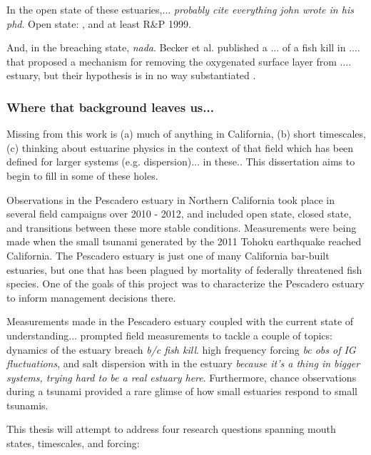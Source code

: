 In the open state of these estuaries,... \emph{probably cite everything john wrote in his phd}. Open state: \parencite{largier_dynamics_1991}, and at least R\&P 1999. 


And, in the breaching state, \emph{nada}. Becker et al. published a ... of a fish kill in .... that proposed a mechanism for removing the oxygenated surface layer from .... estuary, but their hypothesis is in no way substantiated \parencite*{becker_artificial_2009}.




\subsubsection{Where that background leaves us...}

Missing from this work is (a) much of anything in California, (b) short timescales, (c) thinking about estuarine physics in the context of that field which has been defined for larger systems (e.g. dispersion)... in these.. This dissertation aims to begin to fill in some of these holes. 

Observations in the Pescadero estuary in Northern California took place in several field campaigns over 2010 - 2012, and included open state, closed state, and transitions between these more stable conditions. Measurements were being made when the small tsunami generated by the 2011 Tohok$\overline{\mathrm{u}}$ earthquake reached California. The Pescadero estuary is just one of many California bar-built estuaries, but one that has been plagued by mortality of federally threatened fish species. One of the goals of this project was to characterize the Pescadero estuary to inform management decisions there. 

Measurements made in the Pescadero estuary coupled with the current state of understanding... prompted field measurements to tackle a couple of topics: dynamics of the estuary breach \emph{b/c fish kill}. high frequency forcing \emph{bc obs of IG fluctuations}, and salt dispersion with in the estuary \emph{because it's a thing in bigger systems, trying hard to be a real estuary here}. Furthermore, chance observations during a tsunami provided a rare glimse of how small estuaries respond to small tsunamis. 

This thesis will attempt to address four research questions spanning mouth states, timescales, and forcing: 


